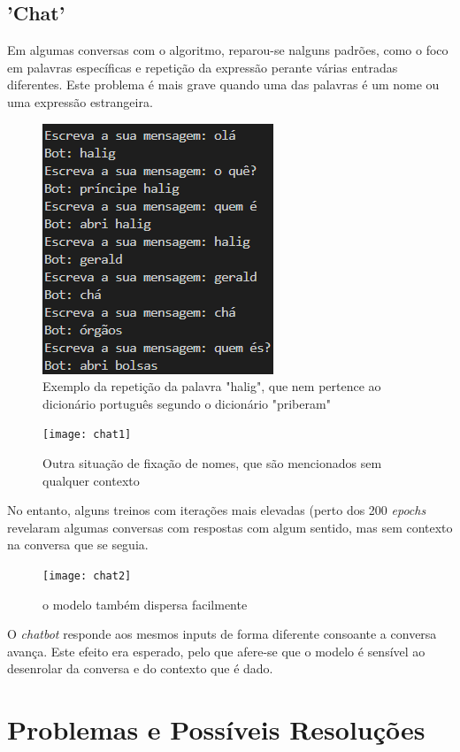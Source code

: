 \documentclass{article}
\begin{document}
\subsection{'Chat'}
Em algumas conversas com o algoritmo, reparou-se nalguns padrões, como o foco em palavras específicas e repetição da expressão perante várias entradas diferentes. Este problema é mais grave quando uma das palavras é um nome ou uma expressão estrangeira. 
\begin{figure}[h]
    \centering
    \includegraphics[scale=0.7]{images/exemplo_chat.png}
    \caption{Exemplo da repetição da palavra "halig", que nem pertence ao dicionário português segundo o dicionário "priberam"}
    \label{chat1}
\end{figure}
\begin{figure}[h]
    \centering
    \texttt{[image: chat1]}
    \caption{Outra situação de fixação de nomes, que são mencionados sem qualquer contexto}
    \label{chat2}
\end{figure}

No entanto, alguns treinos com iterações mais elevadas (perto dos 200 \textit{epochs} revelaram algumas conversas com respostas com algum sentido, mas sem contexto na conversa que se seguia.
\begin{figure}[htb]
    \centering
    \texttt{[image: chat2]}
    \caption{o modelo também dispersa facilmente}
    \label{chat3}
\end{figure}

O \textit{chatbot} responde aos mesmos inputs de forma diferente consoante a conversa avança. Este efeito era esperado, pelo que afere-se que o modelo é sensível ao desenrolar da conversa e do contexto que é dado.

\section{Problemas e Possíveis Resoluções}
\end{document}
